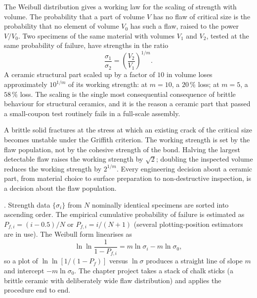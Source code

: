 The Weibull distribution gives a working law for the scaling of
strength with volume. The probability that a part of volume $V$ has
no flaw of critical size is the probability that no element of volume
$V_0$ has such a flaw, raised to the power $V/V_0$. Two specimens of
the same material with volumes $V_1$ and $V_2$, tested at the same
probability of failure, have strengths in the ratio
\[
\frac{\sigma_1}{\sigma_2} = \left(\frac{V_2}{V_1}\right)^{1/m}.
\]
A ceramic structural part scaled up by a factor of $10$ in volume
loses approximately $10^{1/m}$ of its working strength: at $m = 10$,
a $20\,\%$ loss; at $m = 5$, a $58\,\%$ loss. The scaling is the
single most consequential consequence of brittle behaviour for
structural ceramics, and it is the reason a ceramic part that passed
a small-coupon test routinely fails in a full-scale assembly.

\begin{principle}
A brittle solid fractures at the stress at which an existing crack of
the critical size becomes unstable under the Griffith criterion. The
working strength is set by the flaw population, not by the cohesive
strength of the bond. Halving the largest detectable flaw raises the
working strength by $\sqrt{2}$; doubling the inspected volume reduces
the working strength by $2^{1/m}$. Every engineering decision about a
ceramic part, from material choice to surface preparation to
non-destructive inspection, is a decision about the flaw population.
\end{principle}

. Strength
data $\{\sigma_i\}$ from $N$ nominally identical specimens are sorted
into ascending order. The empirical cumulative probability of failure
is estimated as $P_{f,i} = (i - 0.5)/N$ or $P_{f,i} = i/(N+1)$
(several plotting-position estimators are in use). The Weibull form
linearises as
\[
\ln \ln \frac{1}{1 - P_{f,i}} = m \ln \sigma_i - m \ln \sigma_0,
\]
so a plot of $\ln\ln[1/(1-P_f)]$ versus $\ln \sigma$ produces a
straight line of slope $m$ and intercept $-m \ln \sigma_0$. The chapter
project takes a stack of chalk sticks (a brittle ceramic with
deliberately wide flaw distribution) and applies the procedure end
to end.

